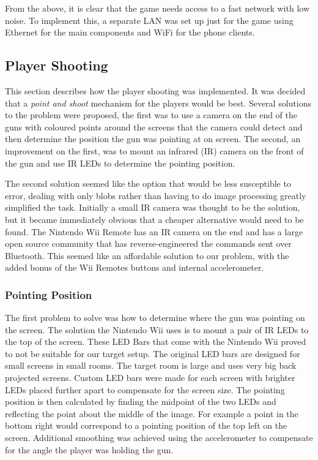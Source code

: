 \documentclass[a4paper,11pt]{article}
\begin{document}
From the above, it is clear that the game needs access to a fast network with low noise. To implement this, a separate LAN was set up just for the game using Ethernet for the main components and WiFi for the phone clients.

\subsection{Player Shooting}

This section describes how the player shooting was implemented. It was decided that a \emph{point and shoot} mechanism for the players would be best. Several solutions to the problem were proposed, the first was to use a camera on the end of the guns with coloured points around the screens that the camera could detect and then determine the position the gun was pointing at on screen. The second, an improvement on the first, was to mount an infrared (IR) camera on the front of the gun and use IR LEDs to determine the pointing position. 

The second solution seemed like the option that would be less susceptible to error, dealing with only blobs rather than having to do image processing greatly simplified the task. Initially a small IR camera was thought to be the solution, but it became immediately obvious that a cheaper alternative would need to be found. The Nintendo Wii Remote has an IR camera on the end and has a large open source community that has reverse-engineered the commands sent over Bluetooth\cite{wiibrew_wiimote}. This seemed like an affordable solution to our problem, with the added bonus of the Wii Remotes buttons and internal accelerometer. 

\subsubsection{Pointing Position}
The first problem to solve was how to determine where the gun was pointing on the screen. The solution the Nintendo Wii uses is to mount a pair of IR LEDs to the top of the screen. These LED Bars that come with the Nintendo Wii proved to not be suitable for our target setup. The original LED bars are designed for small screens in small rooms. The target room is large and uses very big back projected screens. Custom LED bars were made for each screen with brighter LEDs placed further apart to compensate for the screen size. The pointing position is then calculated by finding the midpoint of the two LEDs and reflecting the point about the middle of the image. For example a point in the bottom right would correspond to a pointing position of the top left on the screen. Additional smoothing was achieved using the accelerometer to compensate for the angle the player was holding the gun. 
\end{document}
